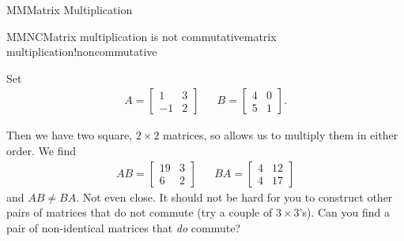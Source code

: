 \begin{subsect}{MM}{Matrix Multiplication}
\begin{example}{MMNC}{Matrix multiplication is not commutative}{matrix multiplication!noncommutative}
\begin{para}Set
%
\begin{align*}
A=
\begin{bmatrix}
1 & 3\\
-1 & 2
\end{bmatrix}
&&
B=
\begin{bmatrix}
4&0\\
5&1
\end{bmatrix}.
\end{align*}\end{para}
%
\begin{para}Then we have two square, $2\times 2$ matrices, so  allows us to multiply them in either order.  We find
%
\begin{align*}
AB=
\begin{bmatrix}
19 & 3\\
6 & 2
\end{bmatrix}
&&
BA=
\begin{bmatrix}
4 & 12\\
4 & 17
\end{bmatrix}
\end{align*}
%
and $AB\neq BA$.  Not even close.  It should not be hard for you to construct other pairs of matrices that do not commute (try a couple of $3\times 3$'s).  Can you find a pair of non-identical matrices that {\em do} commute?\end{para}
%
\end{example}
%
\end{subsect}
%

